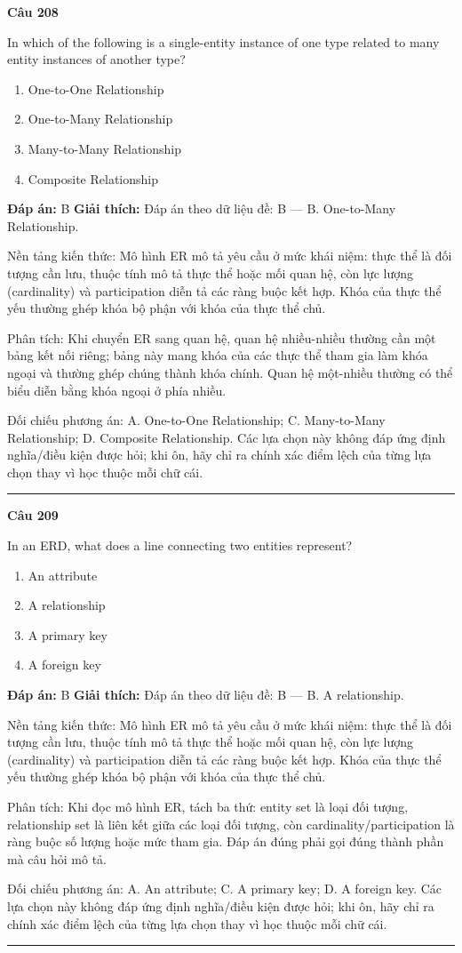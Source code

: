 \documentclass[11pt,a4paper]{article}
\newenvironment{question}[1]{%
  \par\vspace{1em}\noindent\textbf{\large Câu #1}\par\vspace{0.4em}
}{%
  \par\vspace{1em}\hrule\vspace{0.6em}
}
\newenvironment{choices}{%
  \begin{enumerate}[label=\textbf{\Alph*.},leftmargin=2.2em,itemsep=2pt,topsep=3pt]
}{%
  \end{enumerate}
}
\newcommand{\choice}{\item}
\begin{document}
\begin{question}{208}
In which of the following is a single-entity instance of one type related to many entity instances of another type?
\begin{choices}
\choice One-to-One Relationship
\choice One-to-Many Relationship
\choice Many-to-Many Relationship
\choice Composite Relationship
\end{choices}
\textbf{Đáp án:} B
\textbf{Giải thích:} Đáp án theo dữ liệu đề: B — B. One-to-Many Relationship.

Nền tảng kiến thức: Mô hình ER mô tả yêu cầu ở mức khái niệm: thực thể là đối tượng cần lưu, thuộc tính mô tả thực thể hoặc mối quan hệ, còn lực lượng (cardinality) và participation diễn tả các ràng buộc kết hợp. Khóa của thực thể yếu thường ghép khóa bộ phận với khóa của thực thể chủ.

Phân tích: Khi chuyển ER sang quan hệ, quan hệ nhiều-nhiều thường cần một bảng kết nối riêng; bảng này mang khóa của các thực thể tham gia làm khóa ngoại và thường ghép chúng thành khóa chính. Quan hệ một-nhiều thường có thể biểu diễn bằng khóa ngoại ở phía nhiều.

Đối chiếu phương án: A. One-to-One Relationship; C. Many-to-Many Relationship; D. Composite Relationship. Các lựa chọn này không đáp ứng định nghĩa/điều kiện được hỏi; khi ôn, hãy chỉ ra chính xác điểm lệch của từng lựa chọn thay vì học thuộc mỗi chữ cái.
\end{question}

\begin{question}{209}
In an ERD, what does a line connecting two entities represent?
\begin{choices}
\choice An attribute
\choice A relationship
\choice A primary key
\choice A foreign key
\end{choices}
\textbf{Đáp án:} B
\textbf{Giải thích:} Đáp án theo dữ liệu đề: B — B. A relationship.

Nền tảng kiến thức: Mô hình ER mô tả yêu cầu ở mức khái niệm: thực thể là đối tượng cần lưu, thuộc tính mô tả thực thể hoặc mối quan hệ, còn lực lượng (cardinality) và participation diễn tả các ràng buộc kết hợp. Khóa của thực thể yếu thường ghép khóa bộ phận với khóa của thực thể chủ.

Phân tích: Khi đọc mô hình ER, tách ba thứ: entity set là loại đối tượng, relationship set là liên kết giữa các loại đối tượng, còn cardinality/participation là ràng buộc số lượng hoặc mức tham gia. Đáp án đúng phải gọi đúng thành phần mà câu hỏi mô tả.

Đối chiếu phương án: A. An attribute; C. A primary key; D. A foreign key. Các lựa chọn này không đáp ứng định nghĩa/điều kiện được hỏi; khi ôn, hãy chỉ ra chính xác điểm lệch của từng lựa chọn thay vì học thuộc mỗi chữ cái.
\end{question}
\end{document}

